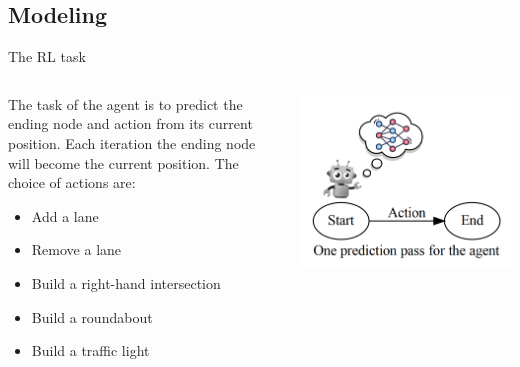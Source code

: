 \documentclass[english, aspectratio=169]{beamer}
\begin{document}
\subsection{Modeling}

\begin{frame}{The RL task}
\begin{columns}
\begin{column}{0.5\textwidth}
	The task of the agent is to predict the ending node and action from its current position. Each iteration the ending node will become the current position. The choice of actions are:
	\begin{itemize}
		\item Add a lane
		\item Remove a lane
		\item Build a right-hand intersection
		\item Build a roundabout
		\item Build a traffic light
	\end{itemize}
\end{column}

\begin{column}{0.5\textwidth}
	\includegraphics[scale=0.25]{images/rl_process.png}
\end{column}

\end{columns}
\end{frame}
\end{document}
